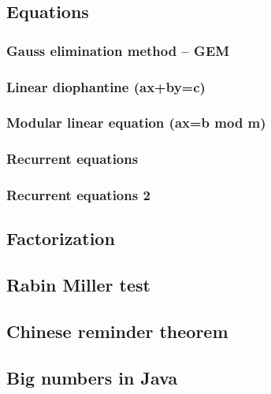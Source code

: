 \documentclass[a4paper]{article}
\begin{document}
    \subsection{Equations}
        \subsubsection{Gauss elimination method -- GEM}
            
        \subsubsection{Linear diophantine (ax+by=c)}
            
        \subsubsection{Modular linear equation (ax=b mod m)}
            
        \subsubsection{Recurrent equations}
            
        \subsubsection{Recurrent equations 2}
            
    \subsection{Factorization}
        
    \subsection{Rabin Miller test}
        
    \subsection{Chinese reminder theorem}
        
    \subsection{Big numbers in Java}
        
\end{document}
